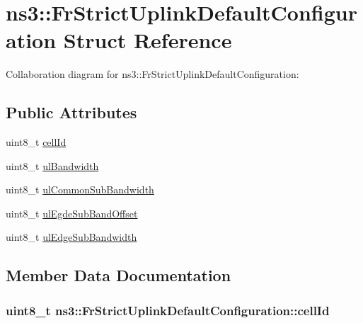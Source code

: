 \hypertarget{structns3_1_1FrStrictUplinkDefaultConfiguration}{}\section{ns3\+:\+:Fr\+Strict\+Uplink\+Default\+Configuration Struct Reference}
\label{structns3_1_1FrStrictUplinkDefaultConfiguration}


Collaboration diagram for ns3\+:\+:Fr\+Strict\+Uplink\+Default\+Configuration\+:
\subsection*{Public Attributes}
\begin{DoxyCompactItemize}
\item 
uint8\+\_\+t \hyperlink{structns3_1_1FrStrictUplinkDefaultConfiguration_acbe4c2528e8981e97acfc1713e5015ae}{cell\+Id}
\item 
uint8\+\_\+t \hyperlink{structns3_1_1FrStrictUplinkDefaultConfiguration_a0525acc798dd3cc4dd15e974748ec0c1}{ul\+Bandwidth}
\item 
uint8\+\_\+t \hyperlink{structns3_1_1FrStrictUplinkDefaultConfiguration_a37bb4b7102718e8660d9233d920ba6c0}{ul\+Common\+Sub\+Bandwidth}
\item 
uint8\+\_\+t \hyperlink{structns3_1_1FrStrictUplinkDefaultConfiguration_aa5d5ed8d729107adeda3b3d0aecfa7e4}{ul\+Egde\+Sub\+Band\+Offset}
\item 
uint8\+\_\+t \hyperlink{structns3_1_1FrStrictUplinkDefaultConfiguration_a004543e1056d56e3b07572ea2838f37b}{ul\+Edge\+Sub\+Bandwidth}
\end{DoxyCompactItemize}


\subsection{Member Data Documentation}
\subsubsection[{\texorpdfstring{cell\+Id}{cellId}}]{\setlength{\rightskip}{0pt plus 5cm}uint8\+\_\+t ns3\+::\+Fr\+Strict\+Uplink\+Default\+Configuration\+::cell\+Id}\hypertarget{structns3_1_1FrStrictUplinkDefaultConfiguration_acbe4c2528e8981e97acfc1713e5015ae}{}\label{structns3_1_1FrStrictUplinkDefaultConfiguration_acbe4c2528e8981e97acfc1713e5015ae}
